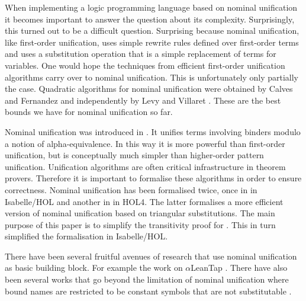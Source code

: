 \begin{isabellebody}
\begin{isamarkuptext}
  When implementing a logic programming language based on nominal unification
  it becomes important to answer the question about its complexity.  Surprisingly,
  this turned out to be a difficult question. Surprising because nominal unification,
  like first-order unification, uses simple rewrite rules defined over first-order 
  terms and uses a substitution operation that is a simple replacement of terms 
  for variables. One would hope the techniques from efficient first-order unification
  algorithms carry over to nominal unification. This is unfortunately only partially
  the case. Quadratic algorithms for nominal unification were obtained by 
  Calves and Fernandez \cite{CalvesFernandez08,Calves10} and independently 
  by Levy and Villaret \cite{levyvillaret10}. These are the best bounds we have 
  for nominal unification so far.\end{isamarkuptext}\isamarkuptrue {}
\isamarkuptrue \begin{isamarkuptext}Nominal unification was introduced in \cite{UrbanPittsGabbay04}. It unifies terms
  involving binders modulo a notion of alpha-equivalence. In this way it is more
  powerful than first-order unification, but is conceptually much simpler than
  higher-order pattern unification. Unification algorithms are often critical
  infrastructure in theorem provers. Therefore it is important to formalise
  these algorithms in order to ensure correctness. Nominal unification has
  been formalised twice, once in \cite{UrbanPittsGabbay04} in Isabelle/HOL 
  and another in \cite{KumarNorrish10} in HOL4. The latter formalises a more 
  efficient version of nominal unification based on triangular substitutions. 
  The main purpose of this paper is to simplify the transitivity proof for . 
  This in turn simplified the formalisation in Isabelle/HOL.

  There have been several fruitful avenues of research that use nominal unification
  as basic building block. For example the work  on $\alpha$LeanTap \cite{alphaleantap08}. 
  There have also been several works that go beyond the limitation
  of nominal unification where bound names are restricted to be constant symbols that are not 
  substitutable \cite{PittsAM:residb,PittsAM:nomel}.\end{isamarkuptext}\isamarkuptrue \isadelimtheory
\endisadelimtheory
\isatagtheory
\endisatagtheory
{\isafoldtheory}\isadelimtheory
\endisadelimtheory
\end{isabellebody}